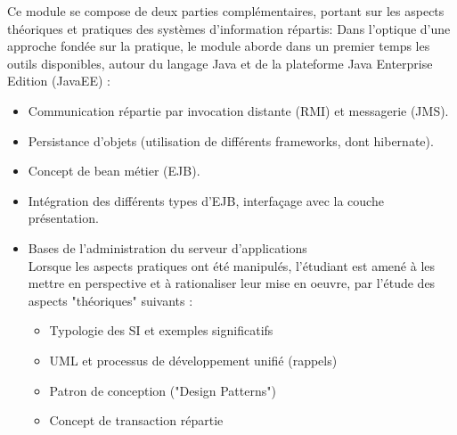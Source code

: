 

{
Ce module se compose de deux parties complémentaires, portant sur les
aspects théoriques et pratiques des systèmes d'information répartis:
Dans l'optique d'une approche fondée sur la pratique, le module aborde
dans un premier temps les outils disponibles, autour du langage Java et de
la plateforme Java Enterprise Edition (JavaEE) :
\begin{itemize} 
\item Communication répartie par invocation distante (RMI) et messagerie (JMS).
\item Persistance d'objets (utilisation de différents frameworks, dont hibernate).
\item Concept de bean métier (EJB).
\item Intégration des différents types d'EJB, interfaçage avec la couche présentation.
\item Bases de l'administration du serveur d'applications\\
Lorsque les aspects pratiques ont été manipulés, l'étudiant est amené à les
mettre en perspective et à rationaliser leur mise en oeuvre, par l'étude des
aspects "théoriques" suivants :
  \begin{itemize} 
  \item Typologie des SI et exemples significatifs
  \item UML et processus de développement unifié (rappels)
  \item Patron de conception ("Design Patterns")
  \item Concept de transaction répartie
  \end{itemize} 
\end{itemize} 
} 
